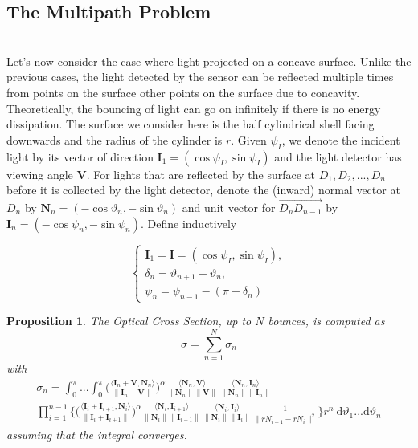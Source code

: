 \documentclass[11pt,reqno]{amsart}
\newtheorem{proposition}{Proposition}
\newcommand{\ip}[2]{\langle {#1}, {#2} \rangle}
\theoremstyle{definition}
\begin{document}
\subsection{The Multipath Problem}~\\
Let's now consider the case where light projected on a concave surface. Unlike
the previous cases, the light detected by the sensor can be reflected multiple
times from points on the surface other points on the surface due to concavity.
Theoretically, the bouncing of light can go on infinitely if there is no energy
dissipation. The surface we consider here is the half cylindrical shell facing
downwards and the radius of the cylinder is $r$. Given $\psi_I$, we denote the
incident light by its vector of direction
$\mathbf{I}_1=(\cos\psi_I,\sin\psi_I)$ and the light detector has viewing angle
$\mathbf{V}$. For lights that are reflected by the surface at $D_1,D_2,...,D_n$
before it is collected by the light detector, denote the (inward) normal vector
at $D_n$ by $\mathbf{N}_n=(-\cos\vartheta_n,-\sin\vartheta_n)$ and unit vector
for $\overrightarrow{D_{n}D_{n-1}}$ by
$\mathbf{I}_n=(-\cos\psi_n,-\sin\psi_n)$.  Define inductively

\begin{equation}\label{equ:induct}
\begin{cases}\mathbf{I}_1=\mathbf{I}=(\cos\psi_{I},\sin\psi_{I}),\\
\delta_n=\vartheta_{n+1}-\vartheta_n,\\
\psi_n=\psi_{n-1}-(\pi-\delta_n)\end{cases}
\tag{$\ast$}
\end{equation} 

\begin{proposition}
The Optical Cross Section, up to $N$ bounces, is computed as
\[
\sigma=\sum_{n=1}^{N}\sigma_n
\]
with
\begin{multline*}
\sigma_n =
\int_{0}^{\pi}...\int_{0}^{\pi}
\Bigg(\frac{\ip{\mathbf{I}_n+\mathbf{V}}{\mathbf{N}_n}}{\|\mathbf{I}_n+\mathbf{V}\|}\Bigg)^\alpha\frac{\ip{\mathbf{N}_n}{\mathbf{V}}}{\|\mathbf{N}_n\| \|\mathbf{V}\|}\frac{\ip{\mathbf{N}_n}{\mathbf{I}_n}}{\|\mathbf{N}_n\| \|\mathbf{I}_n\|} \\ 
\prod_{i=1}^{n-1}\bigg\{ \Bigg(\frac{\ip{\mathbf{I}_i+\mathbf{I}_{i+1}}{\mathbf{N}_i}}{\|\mathbf{I}_i+\mathbf{I}_{i+1}\|}\Bigg)^\alpha \frac{\ip{\mathbf{N}_i}{\mathbf{I}_{i+1}}}{\|\mathbf{N}_i\| \|\mathbf{I}_{i+1}\|}\frac{\ip{\mathbf{N}_i}{\mathbf{I}_i}}{\|\mathbf{N}_i\| \|\mathbf{I}_i\|}\frac{1}{\|rN_{i+1}-rN_i\|^2}\bigg\}r^n\: \mathrm{d}\vartheta_1...\mathrm{d}\vartheta_n\end{multline*}
assuming that the integral converges.
\end{proposition}
\end{document}
